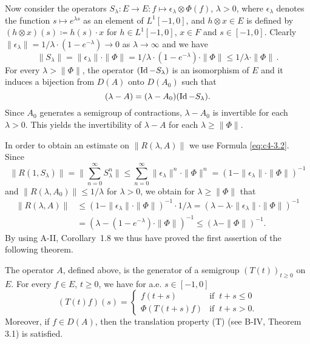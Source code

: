 Now consider the operators $S_{\lambda} \colon E \to E \colon f \mapsto \epsilon_{\lambda} \otimes \Phi(f)$, $\lambda > 0$, where $\epsilon_{\lambda}$ denotes the function $s \mapsto e^{\lambda s}$ as an element of $L^{1}[-1,0]$, 
and $h \otimes x \in E$ is defined by 
\linebreak[2] 
$(h \otimes x)(s) \coloneqq h(s) \cdot x$ for $h \in L^{1}[-1,0]$, $x \in F$ and $s \in [-1,0]$.
Clearly 
\linebreak[4] 
$\|\epsilon_{\lambda}\| = 1/\lambda \cdot (1 - e^{-\lambda}) \to 0$ as $\lambda \to \infty$ and we have
\[
\|S_{\lambda}\| = \|\epsilon_{\lambda}\| \cdot \|\Phi\| = 1/\lambda \cdot (1 - e^{-\lambda}) \cdot \|\Phi\| \leq 1/\lambda \cdot \|\Phi\|\,.
\]
For every $\lambda > \|\Phi\|$, the operator $(\operatorname{Id} - S_{\lambda})$ is an isomorphism of $E$ and it induces a bijection from $D(A)$ onto $D(A_{0})$ such that
\begin{equation}\label{eq:c4-3.2}
(\lambda - A) = (\lambda - A_{0})(\operatorname{Id} - S_{\lambda}).
\end{equation}
Since $A_{0}$ generates a semigroup of contractions, $\lambda - A_{0}$ is invertible for each $\lambda > 0$.
This yields the invertibility of $\lambda - A$ for each $\lambda \geq \|\Phi\|$.

In order to obtain an estimate on $\|R(\lambda,A)\|$ we use Formula \eqref{eq:c4-3.2}.
Since 
\[ 
\|R(1,S_{\lambda})\| = \|\sum_{n=0}^{\infty} S_{\lambda}^n\| \leq \sum_{n=0}^{\infty} \|\epsilon_{\lambda}\|^n \cdot \|\Phi\|^n = (1-\|\epsilon_{\lambda}\| \cdot \|\Phi\|)^{-1}
\]
and $\|R(\lambda,A_0)\| \leq 1/\lambda$ for $\lambda > 0$, we obtain for $\lambda \geq \|\Phi\|$ that
\begin{align*}
\|R(\lambda,A)\| &\leq (1 - \|\epsilon_{\lambda}\| \cdot \|\Phi\|)^{-1} \cdot 1/\lambda = (\lambda - \lambda \cdot \|\epsilon_{\lambda}\| \cdot \|\Phi\|)^{-1} \\
&= (\lambda - (1 - e^{-\lambda}) \cdot \|\Phi\|)^{-1} \leq (\lambda - \|\Phi\|)^{-1}.
\end{align*}
By using A-II, Corollary~1.8 we thus have proved the first assertion of the following theorem.
\begin{theorem}\label{thm:c4-3.1}
%
%
%
The operator $A$, defined above, is the generator of a semigroup $(T(t))_{t \geq 0}$ on $E$.
For every $f \in E$, $t \geq 0$, we have for a.e. $s \in [-1,0]$
\begin{equation}\label{eq:c4-3.3}
(T(t)f)(s) = \begin{cases}
    f(t+s) & \text{if } \ t+s \leq 0 \\
    \Phi(T(t+s)f) & \text{if } \ t+s > 0.
\end{cases}
\end{equation}
Moreover, if $f \in D(A)$, then the translation property (T) (see B-IV, Theorem 3.1) is satisfied.
\end{theorem}

